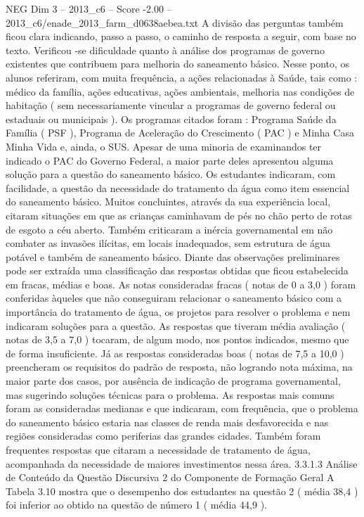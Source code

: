 \begin{textsample}{NEG Dim 3 – 2013\_c6 – Score -2.00 – 2013\_c6/enade\_2013\_farm\_d0638aebea.txt}
A divisão das perguntas também ficou clara indicando, passo a passo, o caminho de resposta a seguir, com base no texto.
Verificou -se dificuldade quanto à análise dos programas de governo existentes que contribuem para melhoria do saneamento básico.
Nesse ponto, os alunos referiram, com muita frequência, a ações relacionadas à Saúde, tais como : médico da família, ações educativas, ações ambientais, melhoria nas condições de habitação ( sem necessariamente vincular a programas de governo federal ou estaduais ou municipais ).
Os programas citados foram : Programa Saúde da Família ( PSF ), Programa de Aceleração do Crescimento ( PAC ) e Minha Casa Minha Vida e, ainda, o SUS.
Apesar de uma minoria de examinandos ter indicado o PAC do Governo Federal, a maior parte deles apresentou alguma solução para a questão do saneamento básico.
Os estudantes indicaram, com facilidade, a questão da necessidade do tratamento da água como item essencial do saneamento básico.
Muitos concluintes, através da sua experiência local, citaram situações em que as crianças caminhavam de pés no chão perto de rotas de esgoto a céu aberto.
Também criticaram a inércia governamental em não combater as invasões ilícitas, em locais inadequados, sem estrutura de água potável e também de saneamento básico.
Diante das observações preliminares pode ser extraída uma classificação das respostas obtidas que ficou estabelecida em fracas, médias e boas.
As notas consideradas fracas ( notas de 0 a 3,0 ) foram conferidas àqueles que não conseguiram relacionar o saneamento básico com a importância do tratamento de água, os projetos para resolver o problema e nem indicaram soluções para a questão.
As respostas que tiveram média avaliação ( notas de 3,5 a 7,0 ) tocaram, de algum modo, nos pontos indicados, mesmo que de forma insuficiente.
Já as respostas consideradas boas ( notas de 7,5 a 10,0 ) preencheram os requisitos do padrão de resposta, não logrando nota máxima, na maior parte dos casos, por ausência de indicação de programa governamental, mas sugerindo soluções técnicas para o problema.
As respostas mais comuns foram as consideradas medianas e que indicaram, com frequência, que o problema do saneamento básico estaria nas classes de renda mais desfavorecida e nas regiões consideradas como periferias das grandes cidades.
Também foram frequentes respostas que citaram a necessidade de tratamento de água, acompanhada da necessidade de maiores investimentos nessa área. 3.3.1.3 Análise de Conteúdo da Questão Discursiva 2 do Componente de Formação Geral A Tabela 3.10 mostra que o desempenho dos estudantes na questão 2 ( média 38,4 ) foi inferior ao obtido na questão de número 1 ( média 44,9 ).

\end{textsample}
